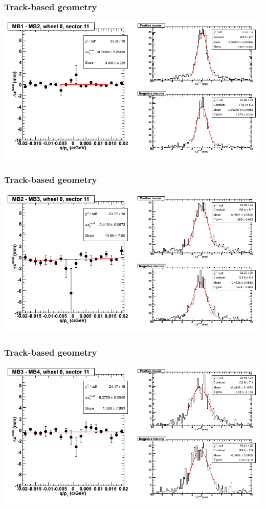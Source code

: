 \documentclass[compress]{beamer}
\begin{document}
\begin{frame}
\frametitle{Track-based geometry}
\includegraphics[width=\linewidth]{NOV4_segdiffs/dt13_resid_C_11_12.png}
\end{frame}

\begin{frame}
\frametitle{Track-based geometry}
\includegraphics[width=\linewidth]{NOV4_segdiffs/dt13_resid_C_11_23.png}
\end{frame}

\begin{frame}
\frametitle{Track-based geometry}
\includegraphics[width=\linewidth]{NOV4_segdiffs/dt13_resid_C_11_34.png}
\end{frame}
\end{document}
